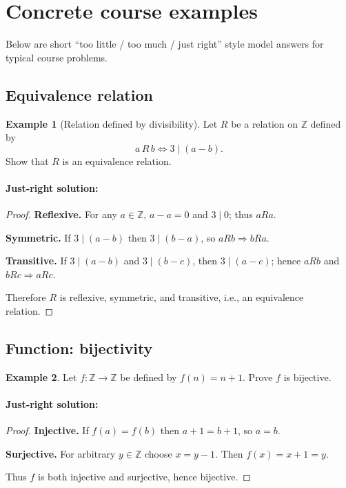 \documentclass[10pt]{article}
\theoremstyle{definition}
\newtheorem{example}{Example}[section]
\theoremstyle{plain}
\numberwithin{equation}{section}
\begin{document}
\section{Concrete course examples}
Below are short ``too little / too much / just right'' style model answers for typical course problems.

\subsection{Equivalence relation}
\begin{example}[Relation defined by divisibility]
Let \(R\) be a relation on \(\mathbb{Z}\) defined by
\[
a \,R\, b \iff 3 \mid (a-b).
\]
Show that \(R\) is an equivalence relation.
\end{example}

\paragraph{Just-right solution:}
\begin{proof}
\textbf{Reflexive.} For any \(a\in\mathbb{Z}\), \(a-a=0\) and \(3\mid 0\); thus \(aRa\).

\textbf{Symmetric.} If \(3\mid (a-b)\) then \(3\mid (b-a)\), so \(aRb\Rightarrow bRa\).

\textbf{Transitive.} If \(3\mid (a-b)\) and \(3\mid (b-c)\), then \(3\mid (a-c)\); hence \(aRb\) and \(bRc\Rightarrow aRc\).

Therefore \(R\) is reflexive, symmetric, and transitive, i.e., an equivalence relation.
\end{proof}

\subsection{Function: bijectivity}
\begin{example}
Let \(f:\mathbb{Z}\to\mathbb{Z}\) be defined by \(f(n)=n+1\). Prove \(f\) is bijective.
\end{example}

\paragraph{Just-right solution:}
\begin{proof}
\textbf{Injective.} If \(f(a)=f(b)\) then \(a+1=b+1\), so \(a=b\).

\textbf{Surjective.} For arbitrary \(y\in\mathbb{Z}\) choose \(x=y-1\). Then \(f(x)=x+1=y\).

Thus \(f\) is both injective and surjective, hence bijective.
\end{proof}
\end{document}
